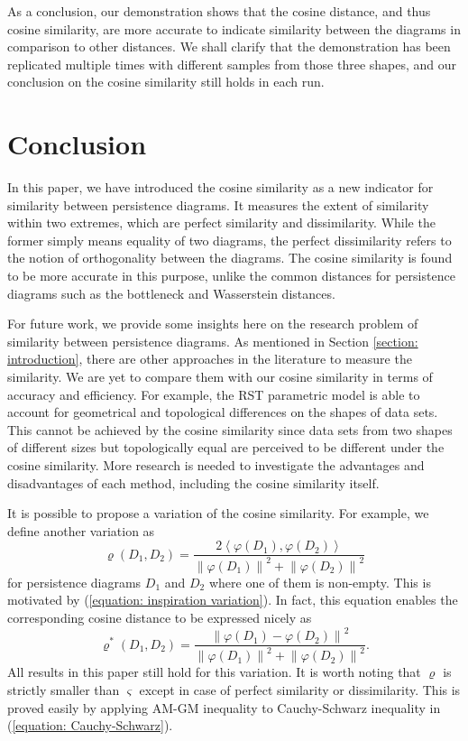 \documentclass[sn-mathphys-num]{sn-jnl}%
\theoremstyle{thmstyleone}%
\theoremstyle{thmstyletwo}%
\theoremstyle{thmstylethree}%
\begin{document}
As a conclusion, our demonstration shows that the cosine distance, and thus cosine similarity, are more accurate to indicate similarity between the diagrams in comparison to other distances. We shall clarify that the demonstration has been replicated multiple times with different samples from those three shapes, and our conclusion on the cosine similarity still holds in each run.

\section{Conclusion}
In this paper, we have introduced the cosine similarity as a new indicator for similarity between persistence diagrams. It measures the extent of similarity within two extremes, which are perfect similarity and dissimilarity. While the former simply means equality of two diagrams, the perfect dissimilarity refers to the notion of orthogonality between the diagrams. The cosine similarity is found to be more accurate in this purpose, unlike the common distances for persistence diagrams such as the bottleneck and Wasserstein distances.

For future work, we provide some insights here on the research problem of similarity between persistence diagrams. As mentioned in Section \ref{section: introduction}, there are other approaches in the literature to measure the similarity. We are yet to compare them with our cosine similarity in terms of accuracy and efficiency. For example, the RST parametric model \cite{Agami} is able to account for geometrical and topological differences on the shapes of data sets. This cannot be achieved by the cosine similarity since data sets from two shapes of different sizes but topologically equal are perceived to be different under the cosine similarity. More research is needed to investigate the advantages and disadvantages of each method, including the cosine similarity itself.

It is possible to propose a variation of the cosine similarity. For example, we define another variation as
\begin{equation*}
	\varrho(D_1, D_2)=\frac{2\left\langle\varphi(D_1), \varphi(D_2)\right\rangle}{\left\|\varphi(D_1)\right\|^2+\left\|\varphi(D_2)\right\|^2}
\end{equation*}
for persistence diagrams $D_1$ and $D_2$ where one of them is non-empty. This is motivated by (\ref{equation: inspiration variation}). In fact, this equation enables the corresponding cosine distance to be expressed nicely as
\begin{equation*}
	\varrho^*(D_1, D_2)=\frac{\left\|\varphi(D_1)-\varphi(D_2)\right\|^2}{\left\|\varphi(D_1)\right\|^2+\left\|\varphi(D_2)\right\|^2}.
\end{equation*}
All results in this paper still hold for this variation. It is worth noting that $\varrho$ is strictly smaller than $\varsigma$ except in case of perfect similarity or dissimilarity. This is proved easily by applying AM-GM inequality \cite{Beckenbach-Bellman} to Cauchy-Schwarz inequality in (\ref{equation: Cauchy-Schwarz}).
\end{document}
